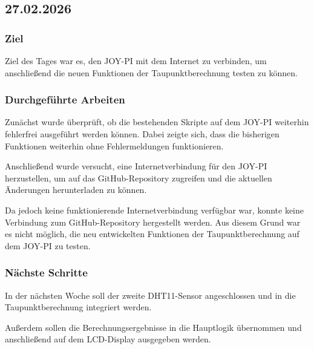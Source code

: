 \subsection{27.02.2026}

\subsubsection{Ziel}

Ziel des Tages war es, den JOY-PI mit dem Internet zu verbinden,
um anschließend die neuen Funktionen der Taupunktberechnung
testen zu können.

\subsubsection{Durchgeführte Arbeiten}

Zunächst wurde überprüft, ob die bestehenden Skripte auf dem
JOY-PI weiterhin fehlerfrei ausgeführt werden können.
Dabei zeigte sich, dass die bisherigen Funktionen weiterhin
ohne Fehlermeldungen funktionieren.

Anschließend wurde versucht, eine Internetverbindung für den
JOY-PI herzustellen, um auf das GitHub-Repository zugreifen
und die aktuellen Änderungen herunterladen zu können.

Da jedoch keine funktionierende Internetverbindung verfügbar
war, konnte keine Verbindung zum GitHub-Repository hergestellt
werden. Aus diesem Grund war es nicht möglich, die neu
entwickelten Funktionen der Taupunktberechnung auf dem
JOY-PI zu testen.

\subsubsection{Nächste Schritte}

In der nächsten Woche soll der zweite DHT11-Sensor
angeschlossen und in die Taupunktberechnung integriert
werden.

Außerdem sollen die Berechnungsergebnisse in die
Hauptlogik übernommen und anschließend auf dem
LCD-Display ausgegeben werden.